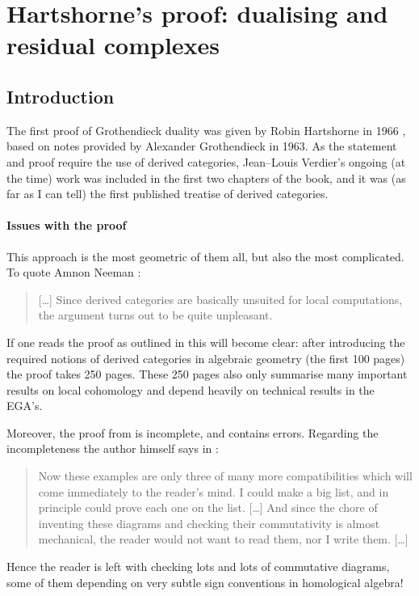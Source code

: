 \section{Hartshorne's proof: dualising and residual complexes}
\label{section:hartshorne}
\subsection{Introduction}
\label{subsection:context}
The first proof of Grothendieck duality was given by Robin Hartshorne in 1966 \cite{hartshorne-residues-and-duality}, based on notes provided by Alexander Grothendieck in 1963. As the statement and proof require the use of derived categories, Jean--Louis Verdier's ongoing (at the time) work was included in the first two chapters of the book, and it was (as far as I can tell) the first published treatise of derived categories.

\paragraph{Issues with the proof}
This approach is the most geometric of them all, but also the most complicated. To quote Amnon Neeman \cite{neeman-grothendieck-duality-bousfield-brown}:
\begin{quote}
  [\ldots] Since derived categories are basically unsuited for local computations, the argument turns out to be quite unpleasant.
\end{quote}
If one reads the proof as outlined in \cite{hartshorne-residues-and-duality} this will become clear: after introducing the required notions of derived categories in algebraic geometry (the first 100 pages) the proof takes 250 pages. These 250 pages also only summarise many important results on local cohomology and depend heavily on technical results in the EGA's.

Moreover, the proof from \cite{hartshorne-residues-and-duality} is incomplete, and contains errors. Regarding the incompleteness the author himself says in \cite[\S II.5]{hartshorne-residues-and-duality}:
\begin{quote}
  Now these examples are only three of many more compatibilities which will come immediately to the reader's mind. I could make a big list, and in principle could prove each one on the list. [\ldots] And since the chore of inventing these diagrams and checking their commutativity is almost mechanical, the reader would not want to read them, nor I write them. [\ldots]
\end{quote}
Hence the reader is left with checking lots and lots of commutative diagrams, some of them depending on very subtle sign conventions in homological algebra!

